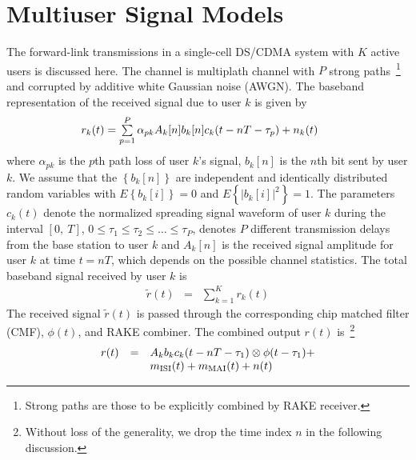 \documentclass[conference]{IEEEtran}
\begin{document}
\section{Multiuser Signal Models}
The forward-link transmissions in a single-cell DS/CDMA system
with $K$ active users is discussed here. The channel is multiplath
channel with $P$ strong paths~\footnote{Strong paths are those to
be explicitly combined by RAKE receiver.} and corrupted by
additive white Gaussian noise (AWGN). The baseband representation
of the received signal due to user $k$ is given by
\begin{equation}
\begin{array}{l}\hspace{-0.2in}
r_k(t)=\sum\limits_{p=1}^{P}\alpha_{pk}A_k[n]
b_k[n]c_k(t-nT-\tau_p)+n_k(t)
\end{array}
\end{equation}
\noindent where $\alpha_{pk}$ is the $p$th path loss of user $k$'s
signal, $b_k{[n]}$ is the $n$th bit sent by user $k$. We assume
that the $\left\{b_k{[n]}\right\}$ are independent and identically
distributed random variables with $E\left\{b_k{[i]}\right\}=0$ and
$E\left\{|b_k{[i]}|^2\right\}=1$. The parameters $c_k(t)$ denote
the normalized spreading signal waveform of user $k$ during the
interval $[0,\ T]$, $0\leq\tau_1\leq\tau_2\leq\ldots\leq\tau_P$,
denotes $P$ different transmission delays from the base station to
user $k$ and $A_k[n]$ is the received signal amplitude for user
$k$ at time $t=nT$, which depends on the possible channel
statistics. The total baseband signal received by user $k$ is
\begin{equation}
\begin{array}{rcl}
\tilde{r}(t)&=&\sum\limits_{k=1}^{K}r_k(t)
\end{array}
\end{equation}
The received signal $\tilde{r}(t)$ is passed through the
corresponding chip matched filter (CMF), $\phi(t)$, and RAKE
combiner. The combined output $r(t)$ is~\footnote{Without loss of
the generality, we drop the time index $n$ in the following
discussion.}
\begin{equation}\hspace{-0.0in}
\begin{array}{rcl}
r(t)&=&A_k b_k c_k(t-nT-\tau_1)\otimes \phi(t-\tau_1)+ \\
&&\hspace{0.0in} m_{\rm ISI}(t) + m_{\rm MAI}(t) + n(t)
\end{array}\label{r_t}
\end{equation}
\end{document}
